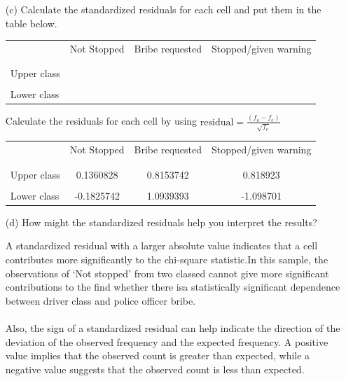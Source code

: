 \documentclass[12pt,letterpaper]{article}
\begin{document}
\begin{enumerate}
	
	
	\newpage
	\item [(c)] Calculate the standardized residuals for each cell and put them in the table below.
	\vspace{1cm}
	
	\begin{table}[h]
		\centering
		\begin{tabular}{l | c c c }
			& Not Stopped & Bribe requested & Stopped/given warning \\
			\\[-1.8ex] 
			\hline \\[-1.8ex]
			Upper class  &  &  &  \\
			\\
			Lower class &  &   &   \\
			
		\end{tabular}
	\end{table}
	
	\vspace{.15cm}
	\noindent Calculate the residuals for each cell by using $\text{residual} = \frac{(f_o - f_e)}{\sqrt{f_e}}$ \\
	
	
	
	\begin{table}[h]
		\centering
		\begin{tabular}{l | c c c }
			& Not Stopped & Bribe requested & Stopped/given warning \\
			\\[-1.8ex] 
			\hline \\[-1.8ex]
			Upper class  & 0.1360828 & 0.8153742  &  0.818923\\
			\\
			Lower class & -0.1825742 & 1.0939393  & -1.098701  \\
			
		\end{tabular}
	\end{table}
	
	\vspace{.7cm}
	\item [(d)] How might the standardized residuals help you interpret the results?  
	
	\vspace{.15cm}
	\noindent A standardized residual with a larger absolute value indicates that a cell contributes more significantly to the chi-square statistic.In this sample, the observations of ‘Not stopped’ from two classed cannot give more significant contributions to the find whether there isa statistically significant dependence between driver class and police officer bribe. \\
	\\Also, the sign of a standardized residual can help indicate the direction of the deviation of the observed frequency and the expected frequency. A positive value implies that the observed count is greater than expected, while a negative value suggests that the observed count is less than expected.\\
	

\end{enumerate}
\end{document}
